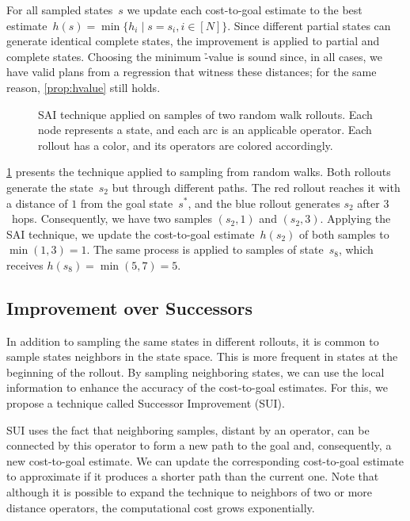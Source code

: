 For all sampled states~$s$ we update each cost-to-goal estimate to the best estimate~$h(s) = \min\{h_i \mid s=s_i, i\in[N]\}$. Since different partial states can generate identical complete states, the improvement is applied to partial and complete states. Choosing the minimum \h-value is sound since, in all cases, we have valid plans from a regression that witness these distances; for the same reason, \cref{prop:hvalue} still holds.

\begin{figure}[tb]
    \caption[SAI technique applied on samples of random walk rollouts.]{SAI technique applied on samples of two random walk rollouts. Each node represents a state, and each arc is an applicable operator. Each rollout has a color, and its operators are colored accordingly.}
    \label{fig:sai}
    \addmargin
    \centering
    
\end{figure}

\cref{fig:sai} presents the technique applied to sampling from random walks. Both rollouts generate the state~$s_2$ but through different paths. The red rollout reaches it with a distance of $1$ from the goal state~$s^*$, and the blue rollout generates $s_2$ after $3$~hops. Consequently, we have two samples $(s_2,1)$ and $(s_2,3)$. Applying the SAI technique, we update the cost-to-goal estimate~$h(s_2)$ of both samples to $\min(1,3)=1$. The same process is applied to samples of state~$s_8$, which receives $h(s_8)=\min(5,7)=5$.

\subsection{Improvement over Successors}
\label{sec:sui}

In addition to sampling the same states in different rollouts, it is common to sample states neighbors in the state space. This is more frequent in states at the beginning of the rollout. By sampling neighboring states, we can use the local information to enhance the accuracy of the cost-to-goal estimates. For this, we propose a technique called Successor Improvement (SUI).

SUI uses the fact that neighboring samples, distant by an operator, can be connected by this operator to form a new path to the goal and, consequently, a new cost-to-goal estimate. We can update the corresponding cost-to-goal estimate to approximate \hstar if it produces a shorter path than the current one. Note that although it is possible to expand the technique to neighbors of two or more distance operators, the computational cost grows exponentially.

